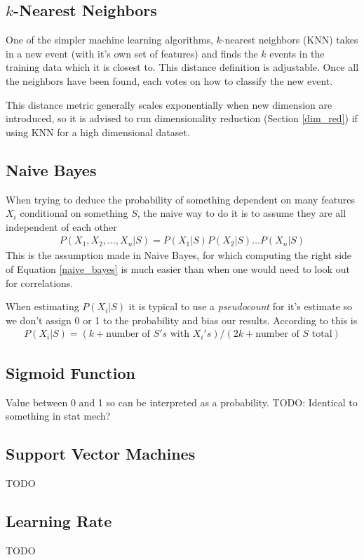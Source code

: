 \subsection{$k$-Nearest Neighbors}
One of the simpler machine learning algorithms, $k$-nearest neighbors (KNN) takes in a new event (with it's own set of features) and finds the  $k$ events in the training data which it is closest to. This distance definition is adjustable. Once all the neighbors have been found, each votes on how to classify the new event.

This distance metric generally scales exponentially when new dimension are introduced, so it is advised to run dimensionality reduction (Section \ref{dim_red}) if using KNN for a high dimensional dataset.
\subsection{Naive Bayes}
When trying to deduce the probability of something dependent on many features $X_i$ conditional on something $S$, the naive way to do it is to assume they are all independent of each other
\begin{align}\label{naive_bayes}
	P(X_1,X_2,\dots,X_n|S) = P(X_1|S)P(X_2|S)\dots P(X_n|S)
\end{align}
This is the assumption made in Naive Bayes, for which computing the right side of Equation \ref{naive_bayes} is much easier than when one would need to look out for correlations.

When estimating $P(X_i|S)$ it is typical to use a \textit{pseudocount} for it's estimate so we don't assign 0 or 1 to the probability and bias our results. According to \cite{sutton} this is
\begin{align}
	P(X_i|S) = (k+\textrm{number~of~} S's\textrm{~with~} X_i's) / (2k+\textrm{number~of~} S \textrm{~total})
\end{align}


\subsection{Sigmoid Function}
Value between 0 and 1 so can be interpreted as a probability. TODO: Identical to something in stat mech?

\subsection{Support Vector Machines}
TODO
\subsection{Learning Rate}
TODO

